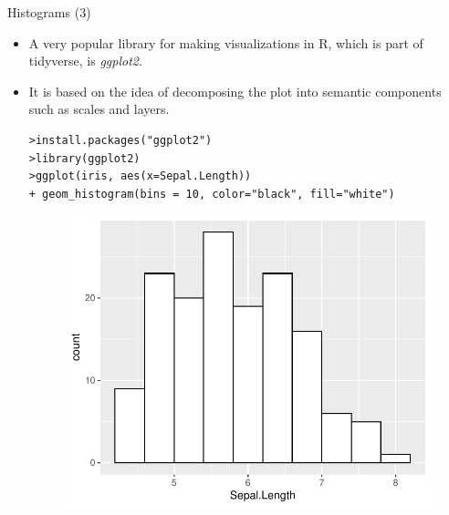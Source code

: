 \documentclass[handout]{beamer}
\begin{document}
\begin{frame}[fragile]{Histograms (3) }
\scriptsize{
\begin{itemize}
 \item A very popular library for making visualizations in R, which is part of tidyverse, is \emph{ggplot2}.
 \item It is based on the idea of decomposing the plot into semantic components such as scales and layers.
 \begin{verbatim}
>install.packages("ggplot2")
>library(ggplot2)
>ggplot(iris, aes(x=Sepal.Length)) 
+ geom_histogram(bins = 10, color="black", fill="white")
 \end{verbatim}
 \begin{figure}[h!]
	\centering
	\includegraphics[scale=0.4]{pics/hist3.pdf}
	
	
\end{figure} 

\end{itemize}

}
\end{frame}
\end{document}
